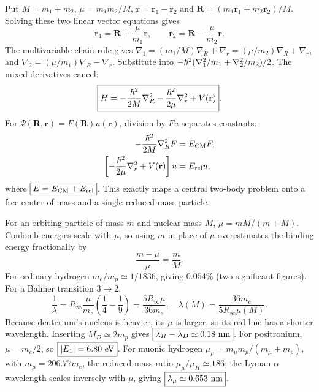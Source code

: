 Put $M=m_1+m_2$, $\mu=m_1m_2/M$,
$\mathbf r=\mathbf r_1-\mathbf r_2$ and
$\mathbf R=(m_1\mathbf r_1+m_2\mathbf r_2)/M$.
Solving these two linear vector equations gives
\begin{equation}
\boxed{\mathbf r_1=\mathbf R+\frac{\mu}{m_1}\mathbf r,\qquad
\mathbf r_2=\mathbf R-\frac{\mu}{m_2}\mathbf r}.
\end{equation}
The multivariable chain rule gives
$\nabla_1=(m_1/M)\nabla_R+\nabla_r
=(\mu/m_2)\nabla_R+\nabla_r$, and
$\nabla_2=(\mu/m_1)\nabla_R-\nabla_r$.
Substitute into $-\hbar^2(\nabla_1^2/m_1+
\nabla_2^2/m_2)/2$. The mixed derivatives cancel:
\begin{equation}
\boxed{H=-\frac{\hbar^2}{2M}\nabla_R^2
-\frac{\hbar^2}{2\mu}\nabla_r^2+V(\mathbf r)}.
\end{equation}
For $\Psi(\mathbf R,\mathbf r)=F(\mathbf R)u(\mathbf r)$,
division by $Fu$ separates constants:
\begin{align}
-\frac{\hbar^2}{2M}\nabla_R^2F&=E_{\rm CM}F,\\
\left[-\frac{\hbar^2}{2\mu}\nabla_r^2+V(\mathbf r)\right]u&=E_{\rm rel}u,
\end{align}
where $\boxed{E=E_{\rm CM}+E_{\rm rel}}$.
This exactly maps a central two-body problem
onto a free center of mass and a single reduced-mass particle.

For an orbiting particle of mass $m$ and nuclear mass $M$,
$\mu=mM/(m+M)$. Coulomb energies scale with $\mu$,
so using $m$ in place of $\mu$ overestimates
the binding energy fractionally by
\begin{equation}
\frac{m-\mu}{\mu}=\frac mM.
\end{equation}
For ordinary hydrogen $m_e/m_p\simeq1/1836$,
giving $\boxed{0.054\%}$ (two significant figures).
For a Balmer transition $3\to2$,
\begin{equation}
\frac1\lambda=
R_\infty\frac{\mu}{m_e}
\left(\frac14-\frac19\right)
=\frac{5R_\infty\mu}{36m_e},
\quad
\lambda(M)=\frac{36m_e}{5R_\infty\mu(M)}.
\end{equation}
Because deuterium's nucleus is heavier,
its $\mu$ is larger, so its red line has a shorter
wavelength. Inserting $M_D\simeq2m_p$ gives
$\boxed{\lambda_H-\lambda_D\simeq0.18\ {\rm nm}}$.
For positronium, $\mu=m_e/2$, so
$\boxed{|E_1|=6.80\ {\rm eV}}$.
For muonic hydrogen $\mu_\mu=
m_\mu m_p/(m_\mu+m_p)$, with
$m_\mu=206.77m_e$, the reduced-mass ratio
$\mu_\mu/\mu_H\simeq186$;
the Lyman-$\alpha$ wavelength scales inversely
with $\mu$, giving
$\boxed{\lambda_\mu\simeq0.653\ {\rm nm}}$.


